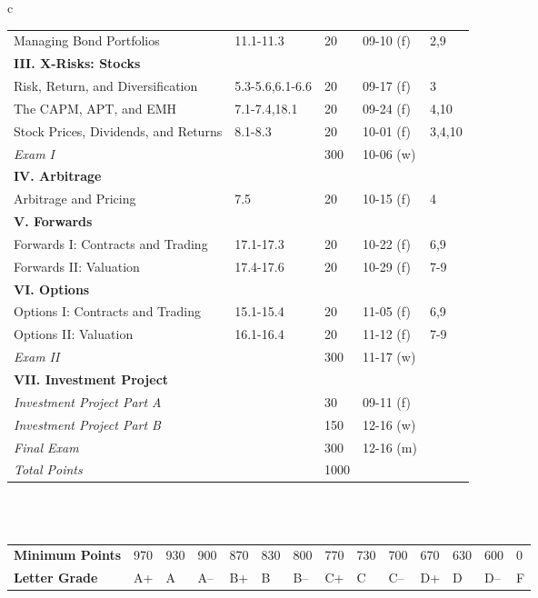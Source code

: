 \documentclass[12pt]{article} %
\begin{document}
\begin{table}[H]
\begin{center}
\begin{tabular}{c}
\begin{tabular}{lllll}
			Managing Bond Portfolios & 11.1-11.3 & 20 & 09-10 (f) &  2,9\\ 
			\multicolumn{5}{l}{\textbf{III. X-Risks: Stocks}} \\
			Risk, Return, and Diversification & 5.3-5.6,6.1-6.6 & 20 & 09-17 (f) &  3\\
			The CAPM, APT, and EMH & 7.1-7.4,18.1 & 20 & 09-24 (f) &  4,10 \\ 
			Stock Prices, Dividends, and Returns & 8.1-8.3 & 20 & 10-01 (f) &  3,4,10\\ \hline
			\multicolumn{2}{l}{\textit{Exam I}} & 300 & 10-06 (w) & \\ \hline
			\multicolumn{5}{l}{\textbf{IV. Arbitrage}} \\
			Arbitrage and Pricing & 7.5 & 20 & 10-15 (f) &  4 \\
			\multicolumn{5}{l}{\textbf{V. Forwards}} \\
			Forwards I: Contracts and Trading & 17.1-17.3 & 20 & 10-22 (f) &  6,9 \\
			Forwards II: Valuation & 17.4-17.6 & 20 & 10-29 (f) &  7-9\\
			\multicolumn{5}{l}{\textbf{VI. Options}} \\
			Options I: Contracts and Trading & 15.1-15.4 & 20 & 11-05 (f) &  6,9\\
			Options II: Valuation & 16.1-16.4 & 20 & 11-12 (f) &  7-9 \\ \hline
			\multicolumn{2}{l}{\textit{Exam II}} & 300 & 11-17 (w)  & \\ \hline
			\multicolumn{5}{l}{\textbf{VII. Investment Project}} \\
			\multicolumn{2}{l}{\textit{Investment Project Part A}} & 30 & 09-11 (f) & \\ 
			\multicolumn{2}{l}{\textit{Investment Project Part B}} & 150 & 12-16 (w) & \\ \hline
			\multicolumn{2}{l}{\textit{Final Exam}} & 300 & 12-16 (m)  & \\ \hline
			\multicolumn{2}{l}{\textit{Total Points}} & 1000 & & 
		\end{tabular}\\ \\
		\begin{tabular}{llllllllllllll}
			\footnotesize
			\textbf{Minimum Points} & 970 & 930 & 900 & 870 & 830 & 800 & 770 & 730 & 700 & 670 & 630 & 600 & 0 \\
			\textbf{Letter Grade} & A+ & A & A-- & B+ & B & B-- & C+ & C & C-- & D+ & D & D-- & F  
		\end{tabular}
		\end{tabular}
	\end{center}
\end{table}
\end{document}
